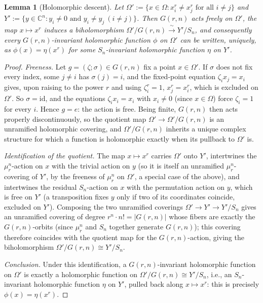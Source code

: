 \documentclass[11pt]{article}
\newtheorem{lemma}[theorem]{Lemma}
\theoremstyle{remark}
\newcommand{\CC}{\mathbb{C}}
\begin{document}
\begin{lemma}[Holomorphic descent]\label{lem:descent}
Let $\Omega':=\{x\in\Omega : x_i^r\ne x_j^r \text{ for all } i\ne j\}$ and $Y':=\{y\in\CC^n : y_i\ne0 \text{ and } y_i\ne y_j\ (i\ne j)\}$. Then $G(r,n)$ acts freely on $\Omega'$, the map $x\mapsto x^r$ induces a biholomorphism $\Omega'/G(r,n)\xrightarrow{\ \sim\ }Y'/S_n$, and consequently every $G(r,n)$-invariant holomorphic function $\phi$ on $\Omega'$ can be written, uniquely, as $\phi(x)=\eta(x^r)$ for some $S_n$-invariant holomorphic function $\eta$ on $Y'$.
\end{lemma}

\begin{proof}
\emph{Freeness.} Let $g=(\zeta;\sigma)\in G(r,n)$ fix a point $x\in\Omega'$. If $\sigma$ does not fix every index, some $j\ne i$ has $\sigma(j)=i$, and the fixed-point equation $\zeta_ix_j=x_i$ gives, upon raising to the power $r$ and using $\zeta_i^r=1$, $x_j^r=x_i^r$, which is excluded on $\Omega'$. So $\sigma=\mathrm{id}$, and the equations $\zeta_ix_i=x_i$ with $x_i\ne0$ (since $x\in\Omega$) force $\zeta_i=1$ for every $i$. Hence $g=e$: the action is free. Being finite, $G(r,n)$ then acts properly discontinuously, so the quotient map $\Omega'\to\Omega'/G(r,n)$ is an unramified holomorphic covering, and $\Omega'/G(r,n)$ inherits a unique complex structure for which a function is holomorphic exactly when its pullback to $\Omega'$ is.

\emph{Identification of the quotient.} The map $x\mapsto x^r$ carries $\Omega'$ onto $Y'$, intertwines the $\mu_r^n$-action on $x$ with the trivial action on $y$ (so it is itself an unramified $\mu_r^n$-covering of $Y'$, by the freeness of $\mu_r^n$ on $\Omega'$, a special case of the above), and intertwines the residual $S_n$-action on $x$ with the permutation action on $y$, which is free on $Y'$ (a transposition fixes $y$ only if two of its coordinates coincide, excluded on $Y'$). Composing the two unramified coverings $\Omega'\to Y'\to Y'/S_n$ gives an unramified covering of degree $r^n\cdot n!=|G(r,n)|$ whose fibers are exactly the $G(r,n)$-orbits (since $\mu_r^n$ and $S_n$ together generate $G(r,n)$); this covering therefore coincides with the quotient map for the $G(r,n)$-action, giving the biholomorphism $\Omega'/G(r,n)\cong Y'/S_n$.

\emph{Conclusion.} Under this identification, a $G(r,n)$-invariant holomorphic function on $\Omega'$ is exactly a holomorphic function on $\Omega'/G(r,n)\cong Y'/S_n$, i.e., an $S_n$-invariant holomorphic function $\eta$ on $Y'$, pulled back along $x\mapsto x^r$: this is precisely $\phi(x)=\eta(x^r)$.
\end{proof}
\end{document}
